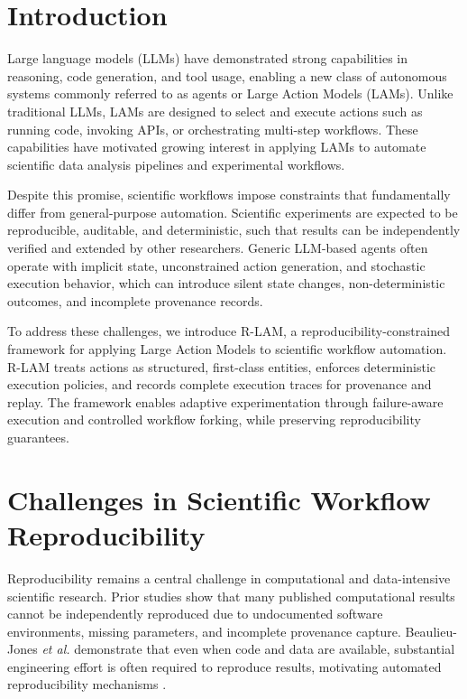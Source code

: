 \documentclass[conference]{IEEEtran}
\begin{document}
\section{Introduction}

Large language models (LLMs) have demonstrated strong capabilities in reasoning, code generation, and tool usage, enabling a new class of autonomous systems commonly referred to as agents or Large Action Models (LAMs). Unlike traditional LLMs, LAMs are designed to select and execute actions such as running code, invoking APIs, or orchestrating multi-step workflows. These capabilities have motivated growing interest in applying LAMs to automate scientific data analysis pipelines and experimental workflows.

Despite this promise, scientific workflows impose constraints that fundamentally differ from general-purpose automation. Scientific experiments are expected to be reproducible, auditable, and deterministic, such that results can be independently verified and extended by other researchers. Generic LLM-based agents often operate with implicit state, unconstrained action generation, and stochastic execution behavior, which can introduce silent state changes, non-deterministic outcomes, and incomplete provenance records.

To address these challenges, we introduce R-LAM, a reproducibility-constrained framework for applying Large Action Models to scientific workflow automation. R-LAM treats actions as structured, first-class entities, enforces deterministic execution policies, and records complete execution traces for provenance and replay. The framework enables adaptive experimentation through failure-aware execution and controlled workflow forking, while preserving reproducibility guarantees.

\section{Challenges in Scientific Workflow Reproducibility}

Reproducibility remains a central challenge in computational and data-intensive scientific research. Prior studies show that many published computational results cannot be independently reproduced due to undocumented software environments, missing parameters, and incomplete provenance capture. Beaulieu-Jones \textit{et al.} demonstrate that even when code and data are available, substantial engineering effort is often required to reproduce results, motivating automated reproducibility mechanisms \cite{beaulieu2017reproducibility}.
\end{document}
